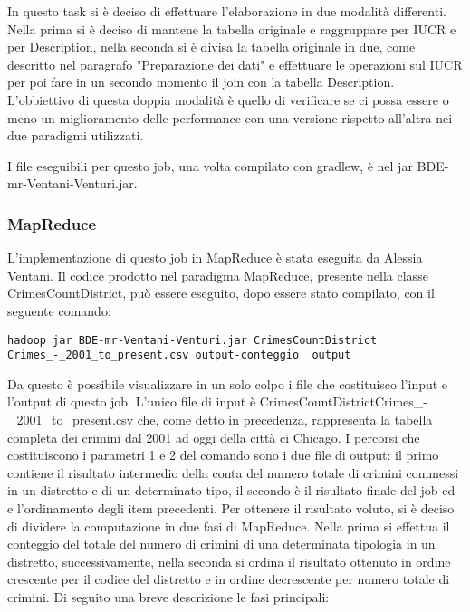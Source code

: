\documentclass[10pt]{article}
\begin{document}
In questo task si è deciso di effettuare l'elaborazione in due modalità differenti. Nella prima si è deciso di mantene la tabella originale e raggruppare per IUCR e per Description, nella seconda si è divisa la tabella originale in due, come descritto nel paragrafo "Preparazione dei dati" e effettuare le operazioni sul IUCR per poi fare in un secondo momento il join con la tabella Description.\\
L'obbiettivo di questa doppia modalità è quello di verificare se ci possa essere o meno un miglioramento delle performance con una versione rispetto all'altra nei due paradigmi utilizzati.

I file eseguibili per questo job, una volta compilato con gradlew, è nel jar BDE-mr-Ventani-Venturi.jar. 


\subsubsection{MapReduce}
L'implementazione di questo job in MapReduce è stata eseguita da Alessia Ventani.
Il codice prodotto nel paradigma MapReduce, presente nella classe CrimesCountDistrict, può essere eseguito, dopo essere stato compilato, con il seguente comando:
\begin{lstlisting}
hadoop jar BDE-mr-Ventani-Venturi.jar CrimesCountDistrict 
Crimes_-_2001_to_present.csv output-conteggio  output
\end{lstlisting}
Da questo è possibile visualizzare in un solo colpo i file che costituisco l'input e l'output di questo job. L'unico file di input è CrimesCountDistrictCrimes\_-\_2001\_to\_present.csv che, come detto in precedenza, rappresenta la tabella completa dei crimini dal 2001 ad oggi della città ci Chicago. I percorsi che costituiscono i parametri 1 e 2 del comando sono i due file di output: il primo contiene il risultato intermedio della conta del numero totale di crimini commessi in un distretto e di un determinato tipo, il secondo è il risultato finale del job ed e l'ordinamento degli item precedenti.
Per ottenere il risultato voluto, si è deciso di dividere la computazione in due fasi di MapReduce. Nella prima si effettua il conteggio del totale del numero di crimini di una determinata tipologia in un distretto, successivamente, nella seconda si ordina il risultato ottenuto in ordine crescente per il codice del distretto e in ordine decrescente per numero totale di crimini.
Di seguito una breve descrizione le fasi principali:
\end{document}
